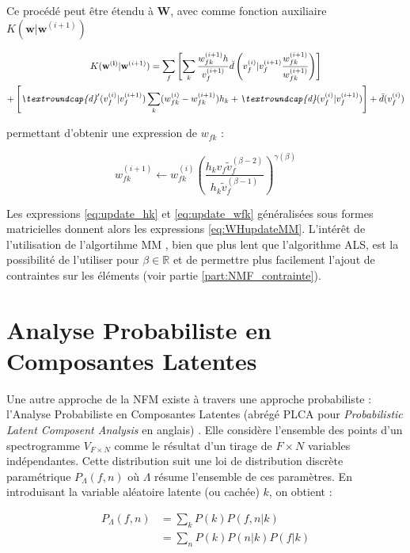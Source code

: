 Ce procédé peut être étendu à $\mathbf{W}$, avec comme fonction auxiliaire $K(\mathbf{w}\vert \mathbf{w}^{(i+1)})$

\begin{multline}\label{eq:derivé-fonc-auxiliaireK}
K(\mathbf{w^{(i)}}\vert \mathbf{w}^{(i+1)}) =\sum_f \left[ \sum_k \frac{w_{fk}^{(i+1)}h}{v_f^{(i+1)}} \breve{d}\left(v_f^{(i)}\vert v_f^{(i+1)}\frac{w_{fk}^{(i+1)}}{w_{fk}^{(i+1)}} \right) \right]\\+ \left[ \textit{\textroundcap{d}}'(v_f^{(i)}\vert v_f^{(i+1)}) \sum_k (w_{fk}^{(i)}-w_{fk}^{(i+1)}) h_k+ \textit{\textroundcap{d}}(v_f^{(i)}\vert v_f^{(i+1)})\right] +\bar{d}(v_f^{(i)})
\end{multline}

permettant d'obtenir une expression de $w_{fk}$ :

\begin{equation}\label{eq:update_wfk}
w_{fk}^{(i+1)} \leftarrow w_{fk}^{(i)}\left( \frac{h_k v_f \tilde{v}_f^{(\beta-2)}}{h_k\tilde{v}_{f}^{(\beta-1)}}\right)^{\gamma(\beta)}
\end{equation} 

Les expressions \ref{eq:update_hk} et \ref{eq:update_wfk} généralisées sous formes matricielles donnent alors les expressions \ref{eq:WHupdateMM}. L'intérêt de l'utilisation de l'algortihme MM , bien que plus lent que l'algorithme ALS, est la possibilité de l'utiliser pour $\beta \in \mathbb{R}$ et de permettre plus facilement l'ajout de contraintes sur les éléments (voir partie \ref{part:NMF_contrainte}).

\section{Analyse Probabiliste en Composantes Latentes}

Une autre approche de la NFM existe à travers une approche probabiliste : l'Analyse Probabiliste en Composantes Latentes (abrégé PLCA pour \textit{Probabilistic Latent Composent Analysis} en anglais) \cite{hofmann_unsupervised_2001} \cite{cazau_understanding_2017}. Elle considère l'ensemble des points d'un spectrogramme $V_{F \times N}$ comme le résultat d'un tirage de $F \times N$ variables indépendantes.  Cette distribution suit une loi de distribution discrète paramétrique $P_{\Lambda}\left(f,n\right)$ où $\Lambda$ résume l'ensemble de ces paramètres. En introduisant la variable aléatoire latente (ou cachée) $k$, on obtient :  

\begin{align}
P_{\Lambda}\left(f,n\right) &= \sum_k P\left( k \right)P\left(f, n\vert k \right)\\
& = \sum_n P(k)P \left(n \vert k\right)P\left(f \vert k \right)
\end{align}

